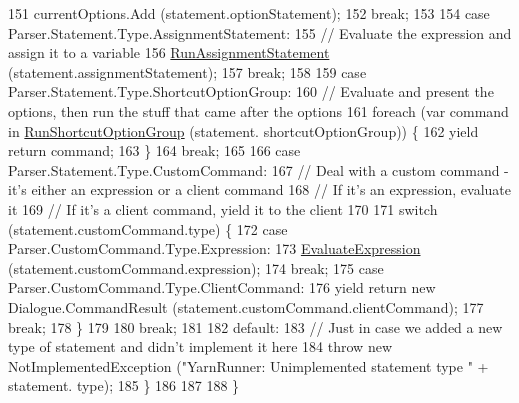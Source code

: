 \begin{DoxyCode}
151                 currentOptions.Add (statement.optionStatement);
152                 \textcolor{keywordflow}{break};
153 
154             \textcolor{keywordflow}{case} Parser.Statement.Type.AssignmentStatement:
155                 \textcolor{comment}{// Evaluate the expression and assign it to a variable}
156                 \hyperlink{a00097_a217c6205821aff5ba31daeb8b3bf2846}{RunAssignmentStatement} (statement.assignmentStatement);
157                 \textcolor{keywordflow}{break};
158 
159             \textcolor{keywordflow}{case} Parser.Statement.Type.ShortcutOptionGroup:
160                 \textcolor{comment}{// Evaluate and present the options, then run the stuff that came after the options}
161                 \textcolor{keywordflow}{foreach} (var command \textcolor{keywordflow}{in} \hyperlink{a00097_a231488eace774d92f5c55034d075016d}{RunShortcutOptionGroup} (statement.
      shortcutOptionGroup)) \{
162                     yield \textcolor{keywordflow}{return} command;
163                 \}
164                 \textcolor{keywordflow}{break};
165 
166             \textcolor{keywordflow}{case} Parser.Statement.Type.CustomCommand:
167                 \textcolor{comment}{// Deal with a custom command - it's either an expression or a client command}
168                 \textcolor{comment}{// If it's an expression, evaluate it}
169                 \textcolor{comment}{// If it's a client command, yield it to the client}
170 
171                 \textcolor{keywordflow}{switch} (statement.customCommand.type) \{
172                 \textcolor{keywordflow}{case} Parser.CustomCommand.Type.Expression:
173                     \hyperlink{a00097_ac57271c72da4ec456a32c94d951c8b65}{EvaluateExpression} (statement.customCommand.expression);
174                     \textcolor{keywordflow}{break};
175                 \textcolor{keywordflow}{case} Parser.CustomCommand.Type.ClientCommand:
176                     yield \textcolor{keywordflow}{return} \textcolor{keyword}{new} Dialogue.CommandResult (statement.customCommand.clientCommand);
177                     \textcolor{keywordflow}{break};
178                 \}
179 
180                 \textcolor{keywordflow}{break};
181 
182             \textcolor{keywordflow}{default}:
183                 \textcolor{comment}{// Just in case we added a new type of statement and didn't implement it here}
184                 \textcolor{keywordflow}{throw} \textcolor{keyword}{new} NotImplementedException (\textcolor{stringliteral}{"YarnRunner: Unimplemented statement type "} + statement.
      type);
185             \}
186         
187 
188         \}
\end{DoxyCode}
